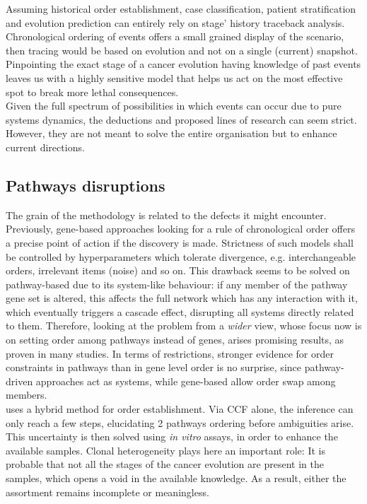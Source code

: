 Assuming historical order establishment, case classification, patient stratification and evolution prediction can entirely rely on stage’ history traceback analysis. Chronological ordering of events offers a small grained display of the scenario, then tracing would be based on evolution and not on a single (current) snapshot.\\

Pinpointing the exact stage of a cancer evolution having knowledge of past events leaves us with a highly sensitive model that helps us act on the most effective spot to break more lethal consequences.
\\

Given the full spectrum of possibilities in which events can occur due to pure systems dynamics, the deductions and proposed lines of research can seem strict. However, they are not meant to solve the entire organisation but to enhance current directions.

\subsection{Pathways disruptions}
The grain of the methodology is related to the defects it might encounter. Previously, gene-based approaches looking for a rule of chronological order offers a precise point of action if the discovery is made. Strictness of such models shall be controlled by hyperparameters which tolerate divergence, e.g. interchangeable orders, irrelevant items (noise) and so on.
This drawback seems to be solved on pathway-based due to its system-like behaviour: if any member of the pathway gene set is altered, this affects the full network which has any interaction with it, which eventually triggers a cascade effect, disrupting all systems directly related to them. Therefore, looking at the problem from a \emph{wider} view, whose focus now is on setting order among pathways instead of genes, arises promising results, as proven in many studies.
In terms of restrictions, stronger evidence for order constraints in pathways than in gene level order is no surprise, since pathway-driven approaches act as systems, while gene-based allow order swap among members.
\\

\cite{Cheng2012AGliomagenesis} uses a hybrid method for order establishment. Via CCF alone, the inference can only reach a few steps, elucidating 2 pathways ordering before ambiguities arise. This uncertainty is then solved using \emph{in vitro} assays, in order to enhance the available samples. Clonal heterogeneity plays here an important role: It is probable that not all the stages of the cancer evolution are present in the samples, which opens a void in the available knowledge. As a result, either the assortment remains incomplete or meaningless.
\\

